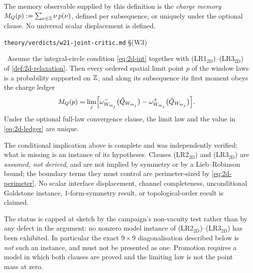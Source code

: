 \begin{definition}
\smallskip
The memory observable supplied by this definition is the \emph{charge memory}
$M_Q(p):=\sum_{\nu\in\mathbb{Z}}\nu\,p(\nu)$, defined per subsequence, or uniquely
under the optional clause. No universal scalar displacement is defined.
\end{definition}

%
{\texttt{theory/verdicts/w21-joint-critic.md} \S(W3)}

\begin{theorem}%
\label{thm:memory-2d-limit}
\statusSketch\ Assume the integral-circle condition \eqref{eq:2d-int} together
with (LR1$_{\mathrm{2D}}$)--(LR3$_{\mathrm{2D}}$) of
\cref{def:2d-relaxation}. Then every ordered spatial limit point $p$ of the
window laws is a probability supported on $\mathbb{Z}$, and along its subsequence its
first moment obeys the charge ledger
\begin{equation}
  M_Q(p)=\lim_j\Bigl[
    \omega^{-}_{W_{m_j}}\bigl(\hat{Q}_{W_{m_j}}\bigr)
   -\omega^{+}_{W_{m_j}}\bigl(\hat{Q}_{W_{m_j}}\bigr)\Bigr].
  \label{eq:2d-ledger}
\end{equation}
Under the optional full-law convergence clause, the limit law and the value in
\eqref{eq:2d-ledger} are unique.
\end{theorem}

\begin{scope}
The conditional implication above is complete and was independently verified;
what is missing is an instance of its hypotheses. Clauses
(LR2$_{\mathrm{2D}}$) and (LR3$_{\mathrm{2D}}$) are \emph{assumed, not
derived}, and are not implied by symmetry or by a Lieb--Robinson bound; the
boundary terms they must control are perimeter-sized by
\eqref{eq:2d-perimeter}. No scalar interface displacement, channel
completeness, unconditional Goldstone instance, $1$-form-symmetry result, or
topological-order result is claimed.

The status is capped at sketch by the campaign's non-vacuity test rather than
by any defect in the argument: no nonzero model instance of
(LR2$_{\mathrm{2D}}$)--(LR3$_{\mathrm{2D}}$) has been exhibited. In
particular the exact $9\times9$ diagonalisation described below is
\emph{not} such an instance, and must not be presented as one. Promotion
requires a model in which both clauses are proved and the limiting law is not
the point mass at zero.
\end{scope}

